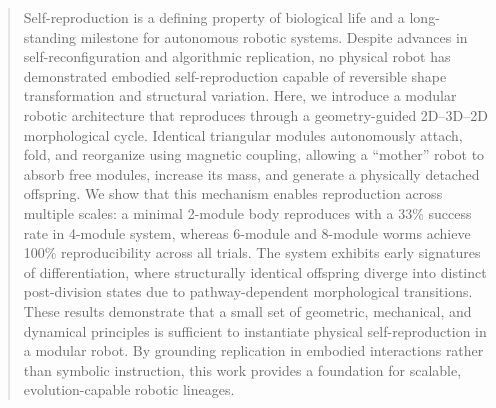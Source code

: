 \documentclass[lettersize,journal]{IEEEtran}
\begin{document}
\begin{abstract}

Self-reproduction is a defining property of biological life and a long-standing milestone for autonomous robotic systems. Despite advances in self-reconfiguration and algorithmic replication, no physical robot has demonstrated embodied self-reproduction capable of reversible shape transformation and structural variation. Here, we introduce a modular robotic architecture that reproduces through a geometry-guided 2D–3D–2D morphological cycle. Identical triangular modules autonomously attach, fold, and reorganize using magnetic coupling, allowing a “mother” robot to absorb free modules, increase its mass, and generate a physically detached offspring.
We show that this mechanism enables reproduction across multiple scales: a minimal 2-module body reproduces with a 33\% success rate in 4-module system, whereas 6-module and 8-module worms achieve 100\% reproducibility across all trials. The system exhibits early signatures of differentiation, where structurally identical offspring diverge into distinct post-division states due to pathway-dependent morphological transitions.
These results demonstrate that a small set of geometric, mechanical, and dynamical principles is sufficient to instantiate physical self-reproduction in a modular robot. By grounding replication in embodied interactions rather than symbolic instruction, this work provides a foundation for scalable, evolution-capable robotic lineages.
\end{abstract}
\end{document}
